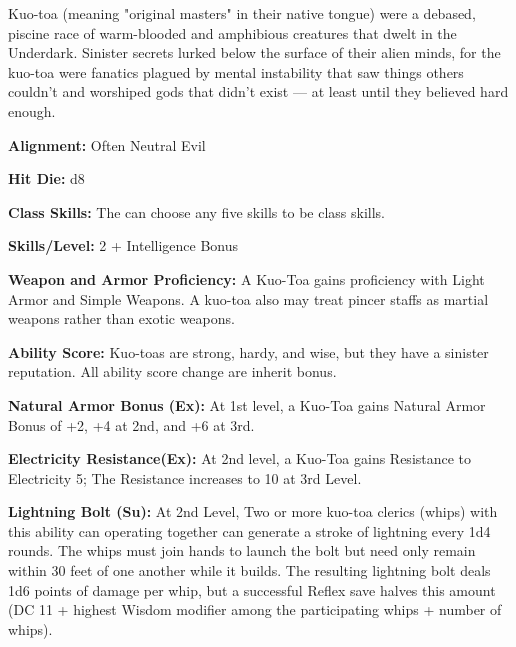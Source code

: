 
Kuo-toa (meaning "original masters" in their native tongue) were a debased, piscine race of warm-blooded and amphibious creatures that dwelt in the Underdark. Sinister secrets lurked below the surface of their alien minds, for the kuo-toa were fanatics plagued by mental instability that saw things others couldn't and worshiped gods that didn't exist — at least until they believed hard enough.

\textbf{Alignment:} Often Neutral Evil

\textbf{Hit Die:} d8

\textbf{Class Skills:} The \currentclassname{} can choose any five skills to be class skills.

\textbf{Skills/Level:} 2 + Intelligence Bonus

\modebab{}
\poorfor{}
\poorref{}
\goodwil{}

\begin{classtable}
\end{classtable}

\classfeatures

\textbf{Weapon and Armor Proficiency:} A Kuo-Toa gains proficiency with Light Armor and Simple Weapons. A kuo-toa also may treat pincer staffs as martial weapons rather than exotic weapons.

\textbf{Ability Score:} Kuo-toas are strong, hardy, and wise, but they have a sinister reputation. All ability score change are inherit bonus.
 
 \textbf{Natural Armor Bonus (Ex):} At 1st level, a Kuo-Toa gains Natural Armor Bonus of +2, +4 at 2nd, and +6 at 3rd.
 
\textbf{Electricity Resistance(Ex):} At 2nd level, a Kuo-Toa gains Resistance to Electricity 5; The Resistance increases to 10 at 3rd Level.
 
\textbf{Lightning Bolt (Su):} At 2nd Level, Two or more kuo-toa clerics (whips) with this ability can operating together can generate a stroke of lightning every 1d4 rounds. The whips must join hands to launch the bolt but need only remain within 30 feet of one another while it builds. The resulting lightning bolt deals 1d6 points of damage per whip, but a successful Reflex save halves this amount (DC 11 + highest Wisdom modifier among the participating whips + number of whips).